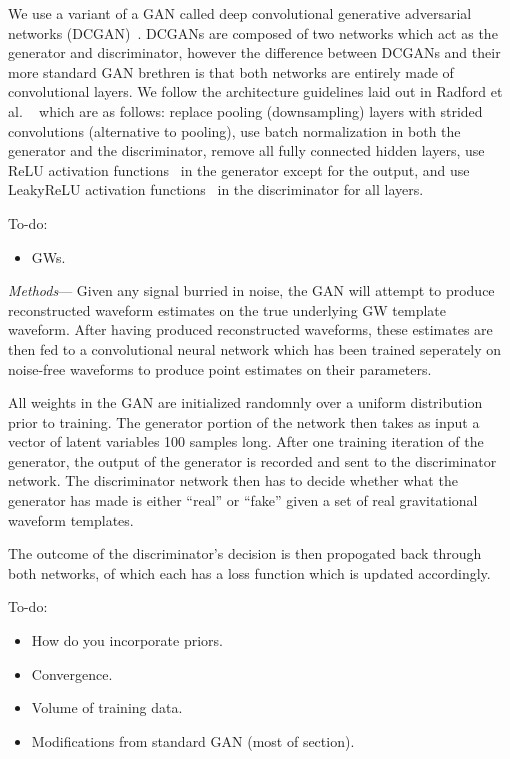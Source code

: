 \documentclass[%
showpacs,
 amsmath,amssymb,
 aps,
 twocolumn,
 prl,
 reprint,
floatfix,
]{revtex4-1}
\begin{document}
We use a variant of a GAN called deep convolutional generative adversarial
networks (DCGAN)~\cite{1511.06434}. DCGANs are composed of two networks which act as
the generator and discriminator, however the difference between DCGANs and their more standard
GAN brethren is that both networks are entirely made of
convolutional layers. We follow the architecture guidelines laid out in Radford et al.
~\cite{1511.06434} which are as follows: replace pooling (downsampling) layers with strided
convolutions (alternative to pooling),
use batch normalization in both the generator and the discriminator, remove all fully
connected hidden layers, use ReLU activation functions~\cite{Nair:2010:RLU:3104322.3104425}
in the generator except for the output,
and use LeakyReLU activation functions~\cite{Maas2013RectifierNI} in the discriminator for all layers.

To-do:

\begin{itemize}
\item GWs.
\end{itemize}

\textit{Methods}--- 
Given any signal burried in noise, the GAN will attempt to produce reconstructed waveform estimates on the true underlying GW template waveform. After having produced reconstructed waveforms, these estimates are then fed to a convolutional neural network which has been trained seperately on noise-free waveforms to produce point estimates on their parameters. 

All weights in the GAN are initialized randomnly over a uniform distribution prior to training. The generator portion of the network then takes as input a vector of latent variables 100 samples long. After one training iteration of the generator, the output of the generator is recorded and sent to the discriminator network. The discriminator network then has to decide whether what the generator has made is either ``real'' or ``fake'' given a set of real gravitational waveform templates.

The outcome of the discriminator's decision is then propogated back through both networks, of which each has a loss function which is updated accordingly.

To-do:

\begin{itemize}
\item How do you incorporate priors.
\item Convergence.
\item Volume of training data.
\item Modifications from standard GAN (most of section).
\end{itemize}
\end{document}
